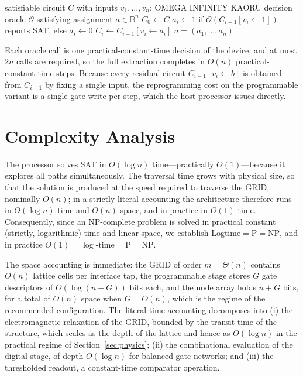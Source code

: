 \documentclass[letterpaper,journal]{IEEEtran}
\begin{document}
\begin{algorithm}[!t]
\caption{Oracle-based search-to-decision extraction}
\label{alg:s2d}
\begin{algorithmic}[1]
\REQUIRE satisfiable circuit $C$ with inputs $v_1,\dots,v_n$; OMEGA
INFINITY KAORU decision oracle $\mathcal{O}$
\ENSURE satisfying assignment $a\in\mathbb{B}^{n}$
\STATE $C_0 \leftarrow C$
  \STATE $a_i \leftarrow 1$ if $\mathcal{O}(C_{i-1}[v_i\!\leftarrow\!1])$
  reports SAT, else $a_i \leftarrow 0$
  \STATE $C_i \leftarrow C_{i-1}[v_i\leftarrow a_i]$ 
\ENDFOR
\RETURN $a=(a_1,\dots,a_n)$
\end{algorithmic}
\end{algorithm}

Each oracle call is one practical-constant-time decision of the device, and
at most $2n$ calls are required, so the full extraction completes in
$O(n)$ practical-constant-time steps. Because every residual circuit
$C_{i-1}[v_i\leftarrow b]$ is obtained from $C_{i-1}$ by fixing a single
input, the reprogramming cost on the programmable variant is a single gate
write per step, which the host processor issues directly.

\section{Complexity Analysis}
\label{sec:complexity}

The processor solves SAT in $O(\log n)$ time---practically $O(1)$---because
it explores all paths simultaneously. The traversal time grows with physical
size, so that the solution is produced at the speed required to traverse the
GRID, nominally $O(n)$; in a strictly literal accounting the architecture
therefore runs in $O(\log n)$ time and $O(n)$ space, and in practice in
$O(1)$ time. Consequently, since an NP-complete problem is solved in
practical constant (strictly, logarithmic) time and linear space, we
establish $\text{Logtime}=\text{P}=\text{NP}$, and in practice
$O(1)=\log\text{-time}=\text{P}=\text{NP}$.

The space accounting is immediate: the GRID of order $m=\Theta(n)$ contains
$O(n)$ lattice cells per interface tap, the programmable stage stores $G$
gate descriptors of $O(\log(n+G))$ bits each, and the node array holds
$n+G$ bits, for a total of $O(n)$ space when $G=O(n)$, which is the regime
of the recommended configuration. The literal time accounting decomposes
into (i) the electromagnetic relaxation of the GRID, bounded by the transit
time of the structure, which scales as the depth of the lattice and hence
as $O(\log n)$ in the practical regime of Section~\ref{sec:physics}; (ii)
the combinational evaluation of the digital stage, of depth $O(\log n)$ for
balanced gate networks; and (iii) the thresholded readout, a constant-time
comparator operation.
\end{document}
